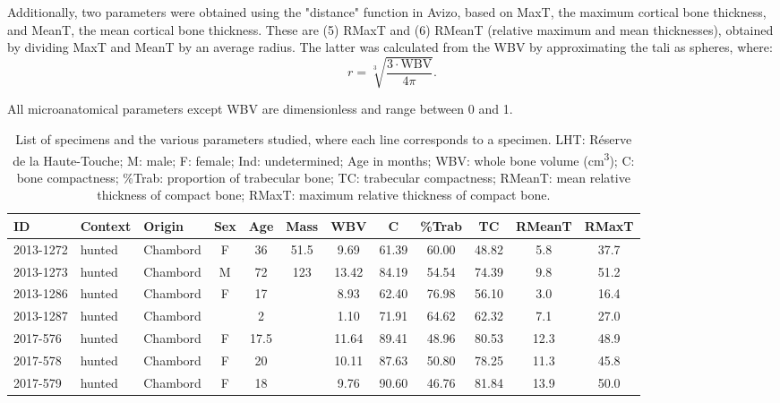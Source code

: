 \documentclass[12pt,a4paper]{article}
\begin{document}
Additionally, two parameters were obtained using the "distance" function in Avizo, based on MaxT, the maximum cortical bone thickness, and MeanT, the mean cortical bone thickness. These are (5) RMaxT and (6) RMeanT (relative maximum and mean thicknesses), obtained by dividing MaxT and MeanT by an average radius. The latter was calculated from the WBV by approximating the tali as spheres, where:
\begin{equation}
r = \sqrt[3]{\frac{3 \cdot \text{WBV}}{4\pi}}.
\end{equation}

All microanatomical parameters except WBV are dimensionless and range between 0 and 1.

\begin{landscape}
\begin{table}[!htbp]
    \centering
    \footnotesize
    \setlength{\tabcolsep}{3pt}  %
    \renewcommand{\arraystretch}{0.05}  %
    \caption{List of specimens and the various parameters studied, where each line corresponds to a specimen. LHT: Réserve de la Haute-Touche; M: male; F: female; Ind: undetermined; Age in months; WBV: whole bone volume (\si{\centi\meter\cubed}); C: bone compactness; \%Trab: proportion of trabecular bone; TC: trabecular compactness; RMeanT: mean relative thickness of compact bone; RMaxT: maximum relative thickness of compact bone.}
    \label{tab:data_boar}
    \footnotesize
    \begin{tabular}{@{}lllccccccccc@{}}
    \toprule
    ID & Context & Origin & Sex & Age & Mass & WBV & C & \%Trab & TC & RMeanT & RMaxT \\
    \midrule
    2013-1272 & hunted & Chambord & F & 36 & 51.5 & 9.69 & 61.39 & 60.00 & 48.82 & 5.8 & 37.7 \\
    2013-1273 & hunted & Chambord & M & 72 & 123 & 13.42 & 84.19 & 54.54 & 74.39 & 9.8 & 51.2 \\
    2013-1286 & hunted & Chambord & F & 17 & ~ & 8.93 & 62.40 & 76.98 & 56.10 & 3.0 & 16.4 \\
    2013-1287 & hunted & Chambord & ~ & 2 & ~ & 1.10 & 71.91 & 64.62 & 62.32 & 7.1 & 27.0 \\
    2017-576 & hunted & Chambord & F & 17.5 & ~ & 11.64 & 89.41 & 48.96 & 80.53 & 12.3 & 48.9 \\
    2017-578 & hunted & Chambord & F & 20 & ~ & 10.11 & 87.63 & 50.80 & 78.25 & 11.3 & 45.8 \\
    2017-579 & hunted & Chambord & F & 18 & ~ & 9.76 & 90.60 & 46.76 & 81.84 & 13.9 & 50.0 \\

\end{tabular}
\end{table}
\end{landscape}
\end{document}
